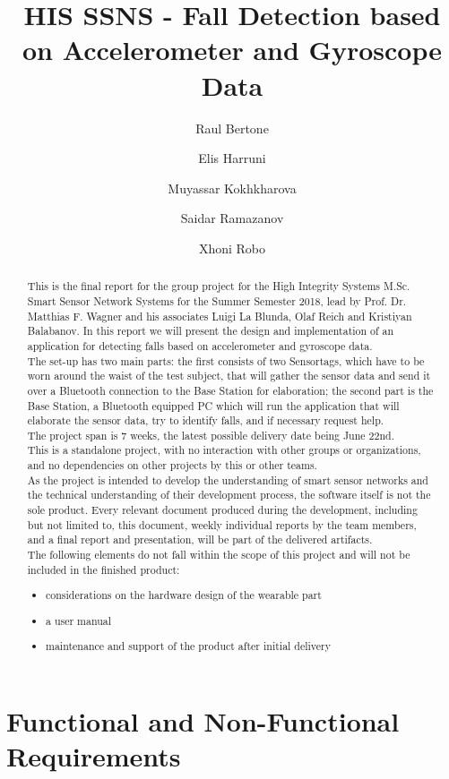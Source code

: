 \documentclass[conference,12pt]{IEEETran}
\title{HIS SSNS - Fall Detection based on Accelerometer and Gyroscope Data}
\author{
	 Raul Bertone
\and Elis Harruni
\and Muyassar Kokhkharova
\and Saidar Ramazanov
\and Xhoni Robo
}
\begin{document}
\maketitle

\begin{abstract}

This is the final report for the group project for the High Integrity Systems M.Sc. Smart Sensor Network Systems for the Summer Semester 2018, lead by Prof. Dr. Matthias F. Wagner and his associates Luigi La Blunda, Olaf Reich and Kristiyan Balabanov. In this report we will present the design and implementation of an application for detecting falls based on accelerometer and gyroscope data\cite{lablunda}.\\
The set-up has two main parts: the first consists of two Sensortags, which have to be worn around the waist of the test subject, that will gather the sensor data and send it over a Bluetooth connection to the Base Station for elaboration; the second part is the Base Station, a Bluetooth equipped PC which will run the application that will elaborate the sensor data, try to identify falls, and if necessary request help.\\
The project span is 7 weeks, the latest possible delivery date being June 22nd.\\
This is a standalone project, with no interaction with other groups or organizations, and no dependencies on other projects by this or other teams.\\
As the project is intended to develop the understanding of smart sensor networks and the technical understanding of their development process, the software itself is not the sole product. Every relevant document produced during the development, including but not limited to, this document, weekly individual reports by the team members, and a final report and presentation, will be part of the delivered artifacts.\\
The following elements do not fall within the scope of this project and will not be included in the finished product:
\begin{itemize}
	\item considerations on the hardware design of the wearable part
	\item a user manual
	\item maintenance and support of the product after initial delivery
\end{itemize}	
\end{abstract}

\section{Functional and Non-Functional Requirements}
\end{document}

